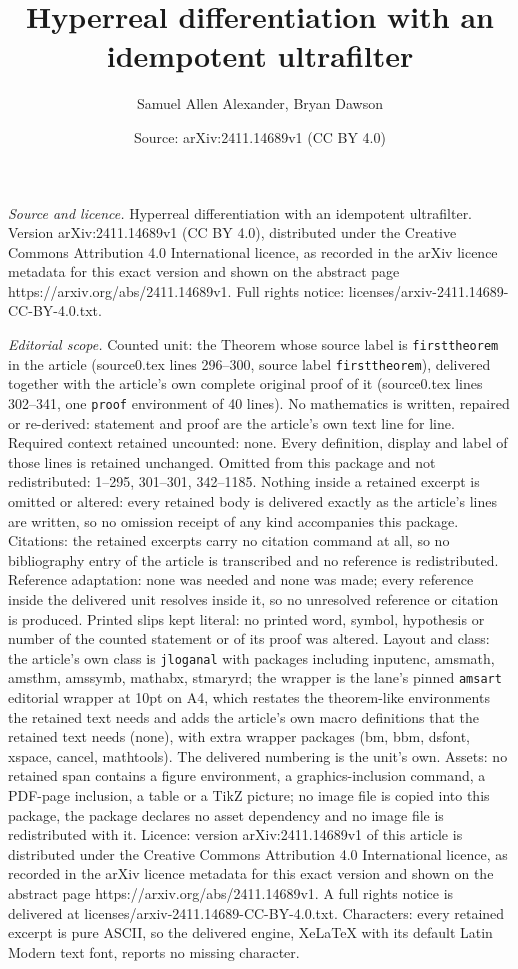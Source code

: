 \documentclass[10pt,a4paper]{amsart}
\title[Hyperreal differentiation with an idempotent ultrafilter]{Hyperreal differentiation with an idempotent ultrafilter}
\author{Samuel Allen Alexander, Bryan Dawson}
\date{Source: arXiv:2411.14689v1 (CC BY 4.0)}
\begin{document}
\maketitle

\noindent\emph{Source and licence.} Hyperreal differentiation with an idempotent ultrafilter. Version arXiv:2411.14689v1 (CC BY 4.0), distributed under the Creative Commons Attribution 4.0 International licence, as recorded in the arXiv licence metadata for this exact version and shown on the abstract page https://arxiv.org/abs/2411.14689v1. Full rights notice: licenses/arxiv-2411.14689-CC-BY-4.0.txt.\par\smallskip

\noindent\textit{Editorial scope.} Counted unit: the Theorem whose source label is \texttt{firsttheorem} in the article (source0.tex lines 296--300, source label \texttt{firsttheorem}), delivered together with the article's own complete original proof of it (source0.tex lines 302--341, one \texttt{proof} environment of 40 lines). No mathematics is written, repaired or re-derived: statement and proof are the article's own text line for line. Required context retained uncounted: none. Every definition, display and label of those lines is retained unchanged. Omitted from this package and not redistributed: 1--295, 301--301, 342--1185. Nothing inside a retained excerpt is omitted or altered: every retained body is delivered exactly as the article's lines are written, so no omission receipt of any kind accompanies this package. Citations: the retained excerpts carry no citation command at all, so no bibliography entry of the article is transcribed and no reference is redistributed. Reference adaptation: none was needed and none was made; every reference inside the delivered unit resolves inside it, so no unresolved reference or citation is produced. Printed slips kept literal: no printed word, symbol, hypothesis or number of the counted statement or of its proof was altered. Layout and class: the article's own class is \texttt{jloganal} with packages including inputenc, amsmath, amsthm, amssymb, mathabx, stmaryrd; the wrapper is the lane's pinned \texttt{amsart} editorial wrapper at 10pt on A4, which restates the theorem-like environments the retained text needs and adds the article's own macro definitions that the retained text needs (none), with extra wrapper packages (bm, bbm, dsfont, xspace, cancel, mathtools). The delivered numbering is the unit's own. Assets: no retained span contains a figure environment, a graphics-inclusion command, a PDF-page inclusion, a table or a TikZ picture; no image file is copied into this package, the package declares no asset dependency and no image file is redistributed with it. Licence: version arXiv:2411.14689v1 of this article is distributed under the Creative Commons Attribution 4.0 International licence, as recorded in the arXiv licence metadata for this exact version and shown on the abstract page https://arxiv.org/abs/2411.14689v1. A full rights notice is delivered at licenses/arxiv-2411.14689-CC-BY-4.0.txt. Characters: every retained excerpt is pure ASCII, so the delivered engine, XeLaTeX with its default Latin Modern text font, reports no missing character.
\end{document}
